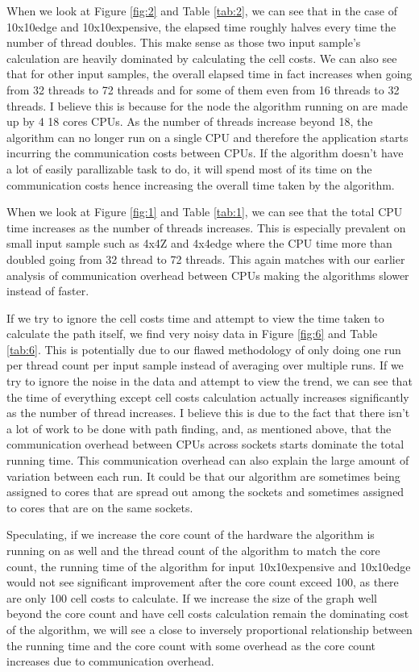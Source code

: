 \documentclass{article}
\begin{document}
When we look at Figure \ref{fig:2} and Table \ref{tab:2}, we can see that in the case of 10x10edge
and 10x10expensive, the elapsed time roughly halves every time the number of thread doubles. This
make sense as those two input sample's calculation are heavily dominated by calculating the cell
costs. We can also see that for other input samples, the overall elapsed time in fact increases when
going from 32 threads to 72 threads and for some of them even from 16 threads to 32 threads. I
believe this is because for the node the algorithm running on are made up by 4 18 cores CPUs. As the
number of threads increase beyond 18, the algorithm can no longer run on a single CPU and therefore
the application starts incurring the communication costs between CPUs. If the algorithm doesn't
have a lot of easily parallizable task to do, it will spend most of its time on the communication
costs hence increasing the overall time taken by the algorithm.

When we look at Figure \ref{fig:1} and Table \ref{tab:1}, we can see that the total CPU time
increases as the number of threads increases. This is especially prevalent on small input sample
such as 4x4Z and 4x4edge where the CPU time more than doubled going from 32 thread to 72 threads.
This again matches with our earlier analysis of communication overhead between CPUs making the
algorithms slower instead of faster.

If we try to ignore the cell costs time and attempt to view the time taken to calculate the path
itself, we find very noisy data in Figure \ref{fig:6} and Table \ref{tab:6}. This is potentially due
to our flawed methodology of only doing one run per thread count per input sample instead of
averaging over multiple runs. If we try to ignore the noise in the data and attempt to view the
trend, we can see that the time of everything except cell costs calculation actually increases
significantly as the number of thread increases. I believe this is due to the fact that there isn't
a lot of work to be done with path finding, and, as mentioned above, that the communication overhead
between CPUs across sockets starts dominate the total running time. This communication overhead can
also explain the large amount of variation between each run. It could be that our algorithm are
sometimes being assigned to cores that are spread out among the sockets and sometimes assigned to
cores that are on the same sockets.

Speculating, if we increase the core count of the hardware the algorithm is running on as well and
the thread count of the algorithm to match the core count, the running time of the algorithm for
input 10x10expensive and 10x10edge would not see significant improvement after the core count exceed
100, as there are only 100 cell costs to calculate. If we increase the size of the graph well beyond
the core count and have cell costs calculation remain the dominating cost of the algorithm, we will
see a close to inversely proportional relationship between the running time and the core count with
some overhead as the core count increases due to communication overhead.
\end{document}
